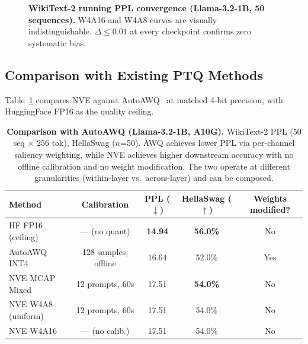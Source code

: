 \documentclass{article}
\begin{document}
\begin{figure}[H]
\centering
{}
\caption{\textbf{WikiText-2 running PPL convergence (Llama-3.2-1B, 50 sequences).}
W4A16 and W4A8 curves are visually indistinguishable. $\Delta \leq 0.01$ at every
checkpoint confirms zero systematic bias.}
\label{fig:ppl_convergence}
\end{figure}


\subsection{Comparison with Existing PTQ Methods}
\label{sec:ptq_comparison}

Table~\ref{tab:ptq} compares NVE against AutoAWQ~\cite{lin2023awq} at matched 4-bit
precision, with HuggingFace FP16 as the quality ceiling.

\begin{table}[H]
\centering
\caption{\textbf{Comparison with AutoAWQ (Llama-3.2-1B, A10G).} WikiText-2 PPL
(50 seq $\times$ 256 tok), HellaSwag ($n$=50). AWQ achieves lower PPL via per-channel
saliency weighting, while NVE achieves higher downstream accuracy with
no offline calibration and no weight modification. The two operate at
different granularities (within-layer vs.\ across-layer) and can be
composed.}
\label{tab:ptq}
\small
\begin{tabular}{lcccc}
\toprule
Method & Calibration & PPL ($\downarrow$) & HellaSwag ($\uparrow$) & Weights modified? \\
\midrule
HF FP16 (ceiling) & --- (no quant) & \textbf{14.94} & \textbf{56.0\%} & No \\
\midrule
AutoAWQ INT4 & 128 samples, offline & 16.64 & 52.0\% & Yes \\
\rowcolor{w4a8color!15}
NVE MCAP Mixed & 12 prompts, 60s & 17.51 & \textbf{54.0\%} & No \\
NVE W4A8 (uniform) & 12 prompts, 60s & 17.51 & 54.0\% & No \\
NVE W4A16 & --- (no calib.) & 17.51 & 54.0\% & No \\
\bottomrule
\end{tabular}
\end{table}
\end{document}
